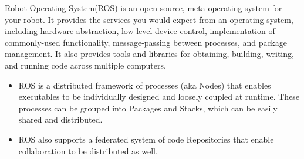 %
%
%
%


{
	Robot Operating System(ROS) is an open-source, meta-operating system for your robot. It provides the services you would expect from an operating system, including hardware abstraction, low-level device control, implementation of commonly-used functionality, message-passing between processes, and package management. It also provides tools and libraries for obtaining, building, writing, and running code across multiple computers. \cite{Quigley:2009}
}
{
	\begin{itemize}
	\item ROS is a distributed framework of processes (aka Nodes) that enables executables to be individually designed and loosely coupled at runtime. These processes can be grouped into Packages and Stacks, which can be easily shared and distributed. 
	\item ROS also supports a federated system of code Repositories that enable collaboration to be distributed as well. \cite{Macenski:2022}
\end{itemize}
}

